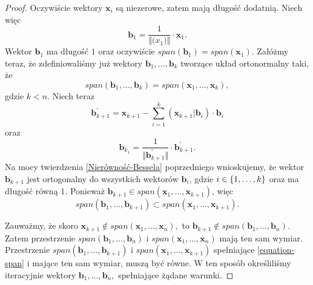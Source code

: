 \documentclass[12pt,a4paper]{report}
\newcommand{\vr}[1]{\mathbf{#1}}
\begin{document}
\begin{proof}
Oczywiście wektory $\vr{x}_{i}$ są niezerowe, zatem mają długość dodatnią. Niech więc
$$
\vr{b}_{1}=\frac{1}{\Vert\vr(x_{1})\Vert}\cdot\vr{x}_{1}.
$$
Wektor $\vr{b}_{1}$ ma długość $1$ oraz oczywiście $span(\vr{b}_{1}) = span (\vr{x}_{1})$. Załóżmy teraz, że zdefiniowaliśmy już wektory $\vr{b}_{1}, \ldots, \vr{b}_{k}$ tworzące układ ortonormalny taki, że
$$
span(\vr{b}_{1}, \ldots, \vr{b}_{k}) = span(\vr{x}_{1}, \ldots, \vr{x}_{k}),
$$
gdzie $k < n$.
Niech teraz 
$$
\vr{b}_{k+1}^{'} = \vr{x}_{k+1} - \sum_{i=1}^{k}(\vr{x}_{k+1}|\vr{b}_{i})\cdot \vr{b}_{i}
$$
oraz
$$
\vr{b}_{k_1} = \frac{1}{\Vert \vr{b}_{k+1}^{'} \Vert} \cdot \vr{b}_{k+1}^{'}.
$$
Na mocy twierdzenia \ref{Nierówność-Bessela} poprzedniego wnioskujemy, że wektor $\vr{b}_{k+1}$ jest ortogonalny do wszystkich wektorów $\vr{b}_{i}$, gdzie $i\in \left\lbrace {1, \ldots, k} \right\rbrace$ oraz ma długość równą $1$. Ponieważ $\vr{b}_{k+1}\in span(\vr{x}_{1}, \ldots, \vr{x}_{k+1})$, więc
\begin{equation} \label{equation-span}
span(\vr{b}_{1}, \ldots, \vr{b}_{k+1}) \subset span(\vr{x}_{1}, \ldots, \vr{x}_{k+1}).
\end{equation}

Zauważmy, że skoro $\vr{x}_{k+1} \notin span(\vr{x}_{1}, \ldots, \vr{x}_{n}),$ to $\vr{b}_{k+1} \notin span (\vr{b}_{1}, \ldots, \vr{b}_{n}).$ Zatem przestrzenie $span(\vr{b}_{1}, \ldots, \vr{b}_{n})$ i $span(\vr{x}_{1}, \ldots, \vr{x}_{n})$ mają ten sam wymiar.
Przestrzenie $span(\vr{b}_{1}, \ldots, \vr{b}_{k+1})$ i $span(\vr{x}_{1}, \ldots, \vr{x}_{k+1})$ spełniające \eqref{equation-span} i mające ten sam wymiar, muszą być równe.
W ten sposób określiliśmy iteracyjnie wektory $\vr{b}_{1}, \ldots, \vr{b}_{n},$ spełniające żądane warunki.
\end{proof}
\end{document}
